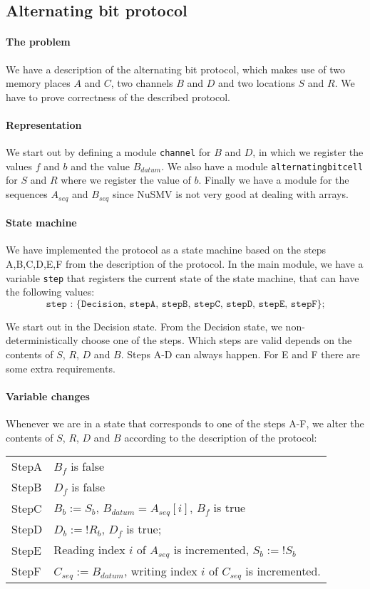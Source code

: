 \documentclass[12pt]{article}
\begin{document}
\clearpage

\subsection*{Alternating bit protocol}
\paragraph{The problem} We have a description of the alternating bit protocol,
which makes use of two memory places $A$ and $C$, two channels $B$ and $D$ and two locations $S$ and $R$. We have to prove correctness of the described protocol.

\paragraph{Representation} We start out by defining a module \texttt{channel} 
for $B$ and $D$, in which we register the values $f$ and $b$ and the value $B_{datum}$.
We also have a module \texttt{alternatingbitcell} for $S$ and $R$ 
where we register the value of $b$. 
Finally we have a module for the sequences $A_{seq}$ and $B_{seq}$ since NuSMV is not very good at dealing with arrays.

\paragraph{State machine} We have implemented the protocol as a state machine 
based on the steps A,B,C,D,E,F from the description of the protocol. 
In the main module, we have a variable \texttt{step}
that registers the current state of the state machine, 
that can have the following values:
\[ \texttt{step : \{Decision, stepA, stepB, stepC, stepD, stepE, stepF\};}\]

We start out in the Decision state. 
From the Decision state, we non-deterministically choose one of the steps. 
Which steps are valid depends on the contents of $S$, $R$, $D$ and $B$.
Steps A-D can always happen. 
For E and F there are some extra requirements. 

\paragraph{Variable changes}
Whenever we are in a state that corresponds to one of the steps A-F, 
we alter the contents of $S$, $R$, $D$ and $B$ according 
to the description of the protocol:\\

\begin{tabular}{|l|p{12cm}|}
\hline
StepA & $B_f$ is false\\
StepB & $D_f$ is false\\
StepC & $B_b := S_b$, $B_{datum} = A_{seq}[i]$, $B_f$ is true\\
StepD & $D_b := !R_b$, $D_f$ is true; \\
StepE & Reading index $i$ of $A_{seq}$ is incremented, $S_b := !S_b$\\
StepF & $C_{seq} := B_{datum}$, writing index $i$ of $C_{seq}$ is incremented.\\
\hline
\end{tabular}
\end{document}
